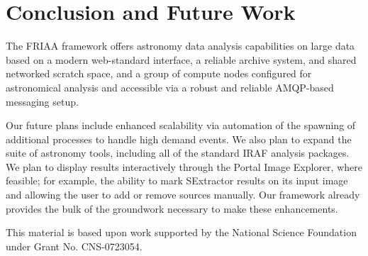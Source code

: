 \section{Conclusion and Future Work}

The FRIAA framework offers astronomy data analysis capabilities on large data based on a modern web-standard interface, a reliable archive system, and shared networked scratch space, and a group of compute nodes configured for astronomical analysis and accessible via a robust and reliable AMQP-based messaging setup. 

Our future plans include enhanced scalability via automation of the spawning of additional processes to handle high demand events.  We also plan to expand the suite of astronomy tools, including all of the standard IRAF analysis packages.  We plan to display results interactively through the Portal Image Explorer, where feasible; for example, the ability to mark SExtractor results on its input image and allowing the user to add or remove sources manually.  Our framework already provides the bulk of the groundwork necessary to make these enhancements.  

 
\acknowledgements 
This material is based upon work supported by the National Science Foundation under Grant No. CNS-0723054.  


  
